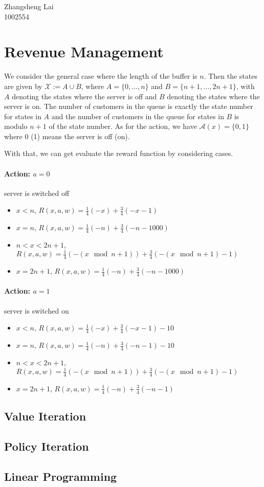 \documentclass[a4paper,10pt]{article}
\theoremstyle{definition}
\begin{document}
Zhangsheng Lai\\1002554



\section*{Revenue Management}
We consider the general case where the length of the buffer is $n$. Then the states are given by $\mathcal{X}:=A \cup B$, where $A= \{0,\ldots, n\}$ and $B= \{n+1,\ldots, 2n+1\}$, with $A$ denoting the states where the server is off and $B$ denoting the states where the server is on. The number of customers in the queue is exactly the state number for states in $A$ and the number of customers in the queue for states in $B$ is modulo $n+1$ of the state number. As for the action, we have $\mathcal{A}(x) = \{0,1\}$ where 0 (1) means the server is off (on).


With that, we can get evaluate the reward function by considering cases.

\paragraph{Action: $a=0$}server is switched off
\begin{itemize}
\item $x <n$, $R(x,a,w) = \frac{1}{4}(-x)+\frac{3}{4}(-x-1)$
\item $x =n$, $R(x,a,w) = \frac{1}{4}(-n)+\frac{3}{4}(-n-1000)$
\item $n< x < 2n+1$, $R(x,a,w) = \frac{1}{4}(-(x \mod n+1))+\frac{3}{4}(-(x \mod n+1)-1)$
\item $x =2n+1$, $R(x,a,w) = \frac{1}{4}(-n)+\frac{3}{4}(-n-1000)$
\end{itemize}

\paragraph{Action: $a=1$}server is switched on
\begin{itemize}
\item $x <n$, $R(x,a,w) = \frac{1}{4}(-x)+\frac{3}{4}(-x-1)-10$
\item $x =n$, $R(x,a,w) = \frac{1}{4}(-n)+\frac{3}{4}(-n-1)-10$
\item $n< x < 2n+1$, $R(x,a,w) = \frac{1}{4}(-(x \mod n+1))+\frac{3}{4}(-(x \mod n+1)-1)$
\item $x =2n+1$, $R(x,a,w) = \frac{1}{4}(-n)+\frac{3}{4}(-n-1)$
\end{itemize}



\subsection*{Value Iteration}

\subsection*{Policy Iteration}

\subsection*{Linear Programming}
\end{document}
